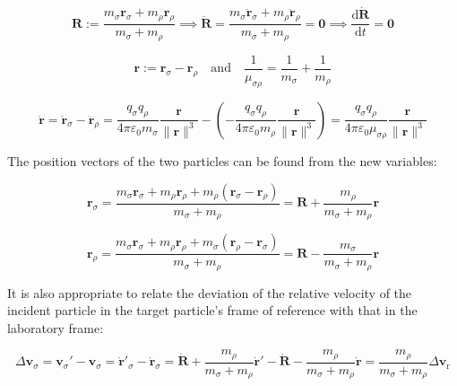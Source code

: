 \begin{equation}
    \mathbf{R}:=\frac{m_\sigma\mathbf{r}_\sigma+m_\rho\mathbf{r}_\rho}{m_\sigma+m_\rho}\implies\ddot{\mathbf{R}}=\frac{m_\sigma\ddot{\mathbf{r}}_\sigma+m_\rho\ddot{\mathbf{r}}_\rho}{m_\sigma+m_\rho}=\mathbf{0}\implies\frac{\mathrm{d}\dot{\mathbf{R}}}{\mathrm{d}t}=\mathbf{0}
\end{equation}

\begin{equation}
    \mathbf{r}:=\mathbf{r}_\sigma -\mathbf{r}_\rho \quad\text{and}\quad\frac{1}{\mu_{\sigma\rho}}=\frac{1}{m_\sigma }+\frac{1}{m_\rho }
\end{equation}

\begin{equation}
    \ddot{\mathbf{r}}=\ddot{\mathbf{r}}_\sigma-\ddot{\mathbf{r}}_\rho=\frac{q_\sigma q_\rho }{4\pi\varepsilon_0 m_\sigma }\frac{\mathbf{r}}{\|\mathbf{r}\|^3}-\left(-\frac{q_\sigma q_\rho }{4\pi\varepsilon_0 m_\rho }\frac{\mathbf{r}}{\|\mathbf{r}\|^3}\right)=\frac{q_\sigma q_\rho }{4\pi\varepsilon_0\mu_{\sigma\rho}}\frac{\mathbf{r}}{\|\mathbf{r}\|^3}
\end{equation}

The position vectors of the two particles can be found from the new variables:

\begin{equation}
    \label{eq-fokker-5}
    \mathbf{r}_\sigma =\frac{m_\sigma \mathbf{r}_\sigma +m_\rho \mathbf{r}_\rho +m_\rho (\mathbf{r}_\sigma -\mathbf{r}_\rho )}{m_\sigma +m_\rho }=\mathbf{R}+\frac{m_\rho }{m_\sigma +m_\rho }\mathbf{r}
\end{equation}

\begin{equation}
    \label{eq-fokker-6}
    \mathbf{r}_\rho =\frac{m_\sigma \mathbf{r}_\sigma +m_\rho \mathbf{r}_\rho +m_\sigma (\mathbf{r}_\rho -\mathbf{r}_\sigma )}{m_\sigma +m_\rho }=\mathbf{R}-\frac{m_\sigma }{m_\sigma +m_\rho }\mathbf{r}
\end{equation}

It is also appropriate to relate the deviation of the relative velocity of the incident particle in the target particle's frame of reference with that in the laboratory frame:

\begin{equation}
    \label{eq-fokker-7}
    \Delta\mathbf{v}_\sigma=\mathbf{v}_\sigma'-\mathbf{v}_\sigma=\dot{\mathbf{r}}'_\sigma-\dot{\mathbf{r}}_\sigma=\dot{\mathbf{R}}+\frac{m_\rho}{m_\sigma+m_\rho}\dot{\mathbf{r}}'-\dot{\mathbf{R}}-\frac{m_\rho}{m_\sigma+m_\rho}\dot{\mathbf{r}}=\frac{m_\rho}{m_\sigma+m_\rho}\Delta\mathbf{v}_\text{r}
\end{equation}

